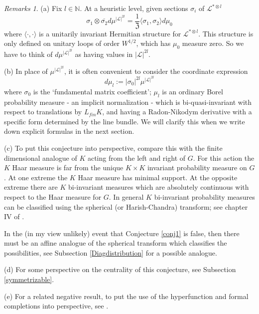 \documentclass{amsart}
\theoremstyle{conjecture}
\theoremstyle{definition}
\theoremstyle{question}
\theoremstyle{questions}
\theoremstyle{remark}
\theoremstyle{remarks}
\newtheorem*{remarks}{Remarks}
\theoremstyle{example}
\numberwithin{equation}{section}
\begin{document}
\begin{remarks}\label{remarksconj1} (a) Fix $l\in \mathbb N$. At a heuristic level, given sections $\sigma_i$ of $\mathcal L^{*\otimes l}$
\begin{equation}\label{heuristic1}\sigma_1\otimes \overline{\sigma_2}d\mu^{|\mathcal L|^{2l}}=\frac{1}{\mathfrak Z}\langle\sigma_1,\sigma_2\rangle d\mu_0\end{equation}
where $\langle \cdot,\cdot \rangle$ is a unitarily invariant Hermitian structure for $\mathcal L^{*\otimes l}$.
This structure is only defined on unitary loops of order $W^{1/2}$, which has $\mu_0$ measure zero.
So we have to think of $d\mu^{|\mathcal L|^{2l}}$ as having values in $|\mathcal L|^{2l}$.

(b) In place of $\mu^{|\mathcal L|^{2l}}$, it is often convenient to consider the coordinate expression
$$d\mu_l:=|\sigma_0|^{2l}\mu^{|\mathcal L|^{2l}}$$
where $\sigma_0$ is the `fundamental matrix coefficient'; $\mu_l$ is an ordinary Borel probability measure - an implicit normalization - which is bi-quasi-invariant with respect to translations by $L_{fin}K$, and having a Radon-Nikodym derivative with a specific form determined by the line bundle. We will clarify this when we write down explicit formulas in the next section.

(c) To put this conjecture into perspective, compare this with the finite dimensional analogue of $K$ acting from the left and right of $G$. For this action the $K$ Haar measure is far from the unique $K\times K$ invariant probability measure on $G$. At one extreme the $K$ Haar measure has minimal support. At the opposite extreme there are $K$ bi-invariant measures which are absolutely continuous with respect to the Haar measure for $G$. In general $K$ bi-invariant probability measures can be classified using the spherical (or Harish-Chandra) transform; see chapter IV of \cite{Helgason}.

In the (in my view unlikely) event that Conjecture \ref{conj1} is false, then there must be an affine analogue of the spherical transform
which classifies the possibilities, see Subsection \ref{Diagdistribution} for a possible analogue.

(d) For some perspective on the centrality of this conjecture, see Subsection \ref{symmetrizable}.

(e) For a related negative result, to put the use of the hyperfunction and formal completions into perspective, see \cite{CM}.
\end{remarks}
\end{document}
